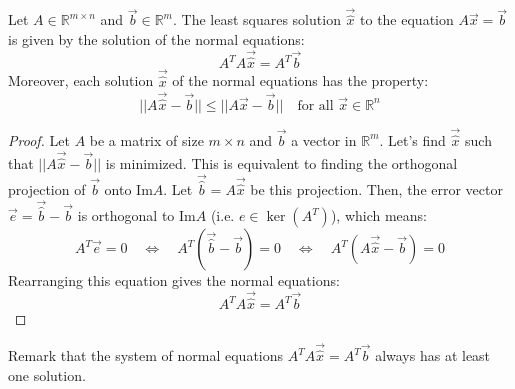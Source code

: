 \begin{theorem}
    Let $A \in \mathbb{R}^{m \times n}$ and $\vec{b} \in \mathbb{R}^m$. The least squares solution $\vec{\hat{x}}$ to the equation $A \vec{x} = \vec{b}$ is given by the solution of the normal equations:
    \[
        A^T A \vec{\hat{x}} = A^T \vec{b}
    \]
    Moreover, each solution $\vec{\hat{x}}$ of the normal equations has the property:
    \[
        ||A \vec{\hat{x}} - \vec{b}|| \leq ||A \vec{x} - \vec{b}|| \quad \text{for all } \vec{x} \in \mathbb{R}^n
    \]
\end{theorem}
\begin{proof}
    Let $A$ be a matrix of size $m \times n$ and $\vec{b}$ a vector in $\mathbb{R}^m$. Let's find $\vec{\hat{x}}$ such that $||A \vec{\hat{x}} - \vec{b}||$ is minimized. This is equivalent to finding the orthogonal projection of $\vec{b}$ onto $\text{Im} A$. Let $\vec{\hat{b}} = A \vec{\hat{x}}$ be this projection. Then, the error vector $\vec{e} = \vec{\hat{b}} - \vec{b}$ is orthogonal to $\text{Im} A$ (i.e. $e \in \ker(A^T)$), which means:
    \[
        A^T \vec{e} = 0 \quad \iff \quad A^T (\vec{\hat{b}} - \vec{b}) = 0 \quad \iff \quad A^T (A \vec{\hat{x}} - \vec{b}) = 0
    \]
    Rearranging this equation gives the normal equations:
    \[
        A^T A \vec{\hat{x}} = A^T \vec{b}
    \]
\end{proof}
Remark that the system of normal equations $A^T A \vec{\hat{x}} = A^T \vec{b}$ always has at least one solution.

